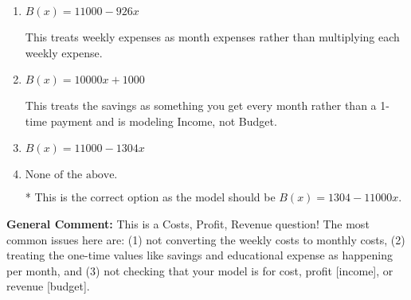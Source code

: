 \documentclass{extbook}[14pt]
\begin{document}
\begin{enumerate}
{\begin{enumerate}[label=\Alph*.]
This treats the educational expense as something you get every month rather than a 1-time payment and is modeling Income, not Budget.
\item \( B(x) = 11000 - 926 x \)

This treats weekly expenses as month expenses rather than multiplying each weekly expense.
\item \( B(x) = 10000 x + 1000 \)

This treats the savings as something you get every month rather than a 1-time payment and is modeling Income, not Budget.
\item \( B(x) = 11000 - 1304 x \)


\item \( \text{None of the above.} \)

* This is the correct option as the model should be $B(x) = 1304 - 11000 x$.
\end{enumerate}

\textbf{General Comment:} This is a Costs, Profit, Revenue question! The most common issues here are: (1) not converting the weekly costs to monthly costs, (2) treating the one-time values like savings and educational expense as happening per month, and (3) not checking that your model is for cost, profit [income], or revenue [budget].
}
\end{enumerate}
\end{document}

